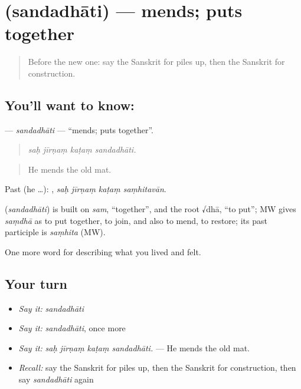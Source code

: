 \section[\texorpdfstring{\sk{सन्दधाति} (sandadhāti)}{सन्दधाति (sandadhāti)}]{ (sandadhāti) — mends; puts together}

\label{lesson:SA-C508-sandadhati}



\begin{quote}
Before the new one: say the Sanskrit for piles up, then the Sanskrit for construction.
\end{quote}

\subsection*{You'll want to know: }
\textbf{} — \emph{sandadhāti} — \textquotedblleft{}mends; puts together\textquotedblright{}.

\begin{quote}
   
\end{quote}

\begin{quote}
\emph{saḥ jīrṇaṃ kaṭaṃ sandadhāti.}
\end{quote}

\begin{quote}
He mends the old mat.
\end{quote}

Past (he …):    , \emph{saḥ jīrṇaṃ kaṭaṃ saṃhitavān}.

\begin{cousinweb}
\textbf{} (\emph{sandadhāti}) is built on \emph{sam}, \textquotedblleft{}together\textquotedblright{}, and the root √dhā, \textquotedblleft{}to put\textquotedblright{}; MW gives \emph{saṃdhā} as to put together, to join, and also to mend, to restore; its past participle is \emph{saṃhita} (MW).
\end{cousinweb}

\begin{grammarlens}[title={What you've built}]
One more word for describing what you lived and felt.
\end{grammarlens}

\subsection*{Your turn}
\begin{itemize}
\raggedright
  \item \emph{Say it:} \emph{sandadhāti}
  \item \emph{Say it:} \emph{sandadhāti}, once more
  \item \emph{Say it:} \emph{saḥ jīrṇaṃ kaṭaṃ sandadhāti.} — He mends the old mat.
  \item \emph{Recall:} say the Sanskrit for piles up, then the Sanskrit for construction, then say \emph{sandadhāti} again
\end{itemize}

